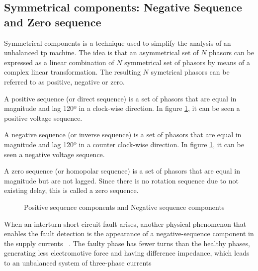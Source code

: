 \subsection{Symmetrical components: Negative Sequence and Zero sequence } %
\label{subsec:negative_sequence_current_compensation}

Symmetrical components is a technique used to simplify the analysis of an unbalanced \acrshort{tp} machine. The idea is that an asymmetrical set of $N$ phasors can be expressed as a linear combination of $N$ symmetrical set of phasors by means of a complex linear transformation. The resulting $N$ symetrical phasors can be referred to as positive, negative or zero.

A positive sequence (or direct sequence) is a set of phasors that are equal in magnitude and lag 120º in a clock-wise direction. In figure \ref{fig:positive_negative_sequence}, it can be seen a positive voltage sequence. 

A negative sequence (or inverse sequence) is a set of phasors that are equal in magnitude and lag 120º in a counter clock-wise direction. In figure \ref{fig:positive_negative_sequence}, it can be seen a negative voltage sequence. 

A zero sequence (or homopolar sequence)  is a set of phasors that are equal in magnitude but are not lagged. Since there is no rotation sequence due to not existing delay, this is called a zero sequence.

\begin{figure}[htbp]
\centering
\caption{Positive sequence components and Negative sequence components }
\label{fig:positive_negative_sequence}
\end{figure}



When an interturn short-circuit fault arises, another physical phenomenon that enables the fault detection is the appearance of a negative-sequence component in the supply currents ~\cite{Cabanas2013}. The faulty phase has fewer turns than the healthy phases, generating less electromotive force and having difference impedance, which leads to an unbalanced system of three-phase currents

